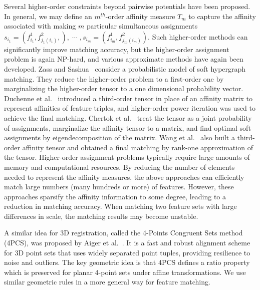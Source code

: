 Several higher-order constraints beyond pairwise potentials have been proposed.
In general, we may define an $m^{th}$-order affinity measure $T_m$ to capture the affinity associated with making $m$ particular simultaneous assignments $s_{i_1}=(f_{i_1}^1,f_{j_1(i_1)}^2,),\; \cdots \;,s_{i_m}=(f_{i_m}^1,f_{j_m(i_m)}^2)$.
Such higher-order methods can significantly improve matching accuracy,
but the higher-order assignment problem is again NP-hard, and various approximate methods have again been developed.
Zass and Sashua~\cite{Zass08} consider a probabilistic model of soft hypergraph matching.
They reduce the higher-order problem to a first-order one by marginalizing the higher-order tensor to a one dimensional probability vector.
Duchenne et al.~\cite{Duchenne_etal09} introduced a third-order tensor in place of an affinity matrix to represent affinities of feature triples,
and higher-order power iteration was used to achieve the final matching.
Chertok et al.~\cite{Chertok10} treat the tensor as a joint probability of assignments, marginalize the affinity tensor to a matrix,
and find optimal soft assignments by eigendecomposition of the matrix.
Wang et al.~\cite{Aiping10} also built a third-order affinity tensor and obtained a final matching by rank-one approximation of the tensor.
Higher-order assignment problems typically require large amounts of memory and computational resources.
By reducing the number of elements needed to represent the affinity measures,
the above approaches can efficiently match large numbers (many hundreds or more) of features.
However, these approaches sparsify the affinity information to some degree, leading to a reduction in matching accuracy.
When matching two feature sets with large differences in scale, the matching results may become unstable.

A similar idea for 3D registration, called the 4-Points Congruent Sets method (4PCS), was proposed by Aiger et al.~\cite{Aiger08}.
It is a fast and robust alignment scheme for 3D point sets that uses widely separated point tuples, providing resilience to noise and outliers.
The key geometric idea is that 4PCS defines a ratio property which is preserved for planar 4-point sets under affine transformations.
We use similar geometric rules in a more general way for feature matching.

